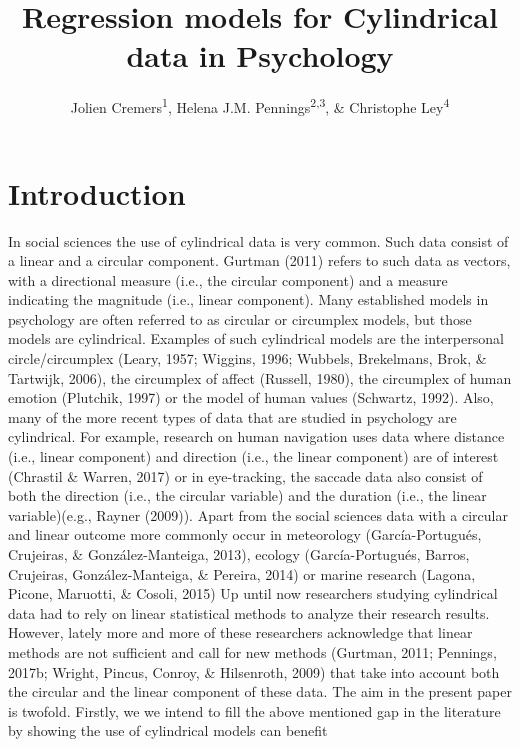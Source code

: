 \documentclass[man]{apa6}
\title{Regression models for Cylindrical data in Psychology}
\author{Jolien Cremers\textsuperscript{1}, Helena J.M.
Pennings\textsuperscript{2,3}, \& Christophe Ley\textsuperscript{4}}
\date{}
\affiliation{
\vspace{0.5cm}
\textsuperscript{1} Department of Methodology and Statistics, Utrecht University\\\textsuperscript{2} TNO\\\textsuperscript{3} Department of Education, Utrecht University\\\textsuperscript{4} Department of Applied Mathematics, Computer Science and Statistics, Ghent University}
\theoremstyle{definition}
\theoremstyle{definition}
\theoremstyle{definition}
\theoremstyle{remark}
\begin{document}
\maketitle

\section{Introduction}\label{Introduction}

In social sciences the use of cylindrical data is very common. Such data
consist of a linear and a circular component. Gurtman (2011) refers to
such data as vectors, with a directional measure (i.e., the circular
component) and a measure indicating the magnitude (i.e., linear
component). Many established models in psychology are often referred to
as circular or circumplex models, but those models are cylindrical.
Examples of such cylindrical models are the interpersonal
circle/circumplex (Leary, 1957; Wiggins, 1996; Wubbels, Brekelmans,
Brok, \& Tartwijk, 2006), the circumplex of affect (Russell, 1980), the
circumplex of human emotion (Plutchik, 1997) or the model of human
values (Schwartz, 1992). \newline \indent Also, many of the more recent
types of data that are studied in psychology are cylindrical. For
example, research on human navigation uses data where distance (i.e.,
linear component) and direction (i.e., the linear component) are of
interest (Chrastil \& Warren, 2017) or in eye-tracking, the saccade data
also consist of both the direction (i.e., the circular variable) and the
duration (i.e., the linear variable)(e.g., Rayner (2009)). Apart from
the social sciences data with a circular and linear outcome more
commonly occur in meteorology (García-Portugués, Crujeiras, \&
González-Manteiga, 2013), ecology (García-Portugués, Barros, Crujeiras,
González-Manteiga, \& Pereira, 2014) or marine research (Lagona, Picone,
Maruotti, \& Cosoli, 2015) \newline \indent Up until now researchers
studying cylindrical data had to rely on linear statistical methods to
analyze their research results. However, lately more and more of these
researchers acknowledge that linear methods are not sufficient and call
for new methods (Gurtman, 2011; Pennings, 2017b; Wright, Pincus, Conroy,
\& Hilsenroth, 2009) that take into account both the circular and the
linear component of these data. \newline \indent The aim in the present
paper is twofold. Firstly, we we intend to fill the above mentioned gap
in the literature by showing the use of cylindrical models can benefit
\end{document}
